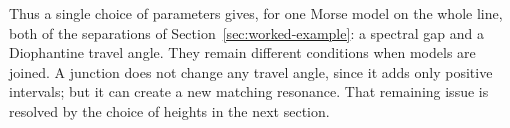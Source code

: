 Thus a single choice of parameters gives, for one Morse model on the
whole line, both of the separations of
Section~\ref{sec:worked-example}: a spectral gap and a Diophantine
travel angle. They remain different conditions when models are joined.
A junction does not change any travel angle, since it adds only
positive intervals; but it can create a new matching resonance. That
remaining issue is resolved by the choice of heights in the next
section.
